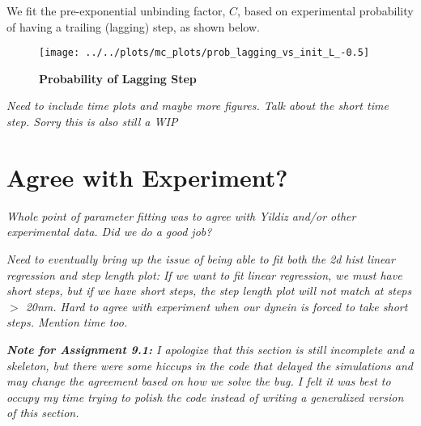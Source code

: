 We fit the pre-exponential unbinding factor, $C$, based on experimental probability of having a trailing (lagging) step, as shown below.

\begin{figure}[H]
	\centering
	\texttt{[image: ../../plots/mc\_plots/prob\_lagging\_vs\_init\_L\_-0.5]}
	\caption[Probability of Lagging Step]{\textbf{Probability of Lagging Step}}
	\label{fig:ProbTrail}
\end{figure}

\textit{Need to include time plots and maybe more figures. Talk about the short time step. Sorry this is also still a WIP}

\section{Agree with Experiment?}
\textit{Whole point of parameter fitting was to agree with Yildiz and/or other experimental data. Did we do a good job? }

\textit{Need to eventually bring up the issue of being able to fit both the 2d hist linear regression and step length plot: If we want to fit linear regression, we must have short steps, but if we have short steps, the step length plot will not match at steps $>$ 20nm. Hard to agree with experiment when our dynein is forced to take short steps. Mention time too.}

\textit{\textbf{Note for Assignment 9.1:} I apologize that this section is still incomplete and a skeleton, but there were some hiccups in the code that delayed the simulations and may change the agreement based on how we solve the bug. I felt it was best to occupy my time trying to polish the code instead of writing a generalized version of this section.}